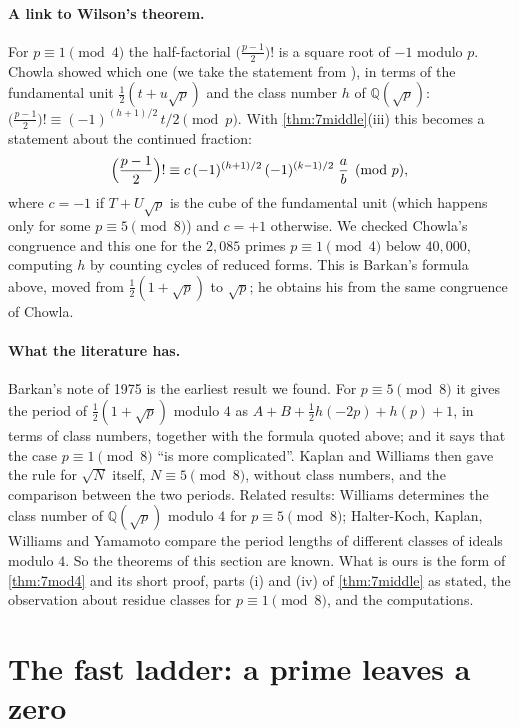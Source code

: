 \paragraph{A link to Wilson's theorem.} For $p\equiv1\pmod4$ the half-factorial
$\bigl(\tfrac{p-1}{2}\bigr)!$ is a square root of $-1$ modulo $p$. Chowla \citep{Chowla1961} showed which
one (we take the statement from \citep[Lemma 1]{Williams1981}), in terms of the fundamental unit $\tfrac12(t+u\sqrt p)$ and the class number $h$ of
$\mathbb{Q}(\sqrt p)$: $\bigl(\tfrac{p-1}{2}\bigr)!\equiv(-1)^{(h+1)/2}\,t/2\pmod p$. With
\cref{thm:7middle}(iii) this becomes a statement about the continued fraction:
\[
  \Bigl(\frac{p-1}{2}\Bigr)!\equiv c\,(-1)^{(h+1)/2}\,(-1)^{(k-1)/2}\;\frac ab\pmod p ,
\]
where $c=-1$ if $T+U\sqrt p$ is the cube of the fundamental unit (which happens only for some
$p\equiv5\pmod8$) and $c=+1$ otherwise. We checked Chowla's congruence and this one for the $2{,}085$
primes $p\equiv1\pmod4$ below $40{,}000$, computing $h$ by counting cycles of reduced forms. This is
Barkan's formula above, moved from $\tfrac12(1+\sqrt p)$ to $\sqrt p$; he obtains his from the same
congruence of Chowla.

\paragraph{What the literature has.} Barkan's note of 1975 \citep{Barkan1975} is the earliest result we
found. For $p\equiv5\pmod8$ it gives the period of $\tfrac12(1+\sqrt p)$ modulo $4$ as
$A+B+\tfrac12h(-2p)+h(p)+1$, in terms of class numbers, together with the formula quoted above; and it
says that the case $p\equiv1\pmod8$ ``is more complicated''. Kaplan and Williams \citep{KaplanWilliams1986} then gave
the rule for $\sqrt N$ itself, $N\equiv5\pmod8$, without class numbers, and the comparison between the
two periods. Related results: Williams \citep{Williams1981} determines the class number of
$\mathbb{Q}(\sqrt p)$ modulo $4$ for $p\equiv5\pmod8$; Halter-Koch, Kaplan, Williams and Yamamoto
\citep{HalterKoch1991} compare the period lengths of different classes of ideals modulo $4$. So the theorems
of this section are known. What is ours is the form of \cref{thm:7mod4} and its short proof,
parts (i) and (iv) of \cref{thm:7middle} as stated, the observation about residue classes for
$p\equiv1\pmod8$, and the computations.

\section{The fast ladder: a prime leaves a zero}\label{sec:fastladder}

